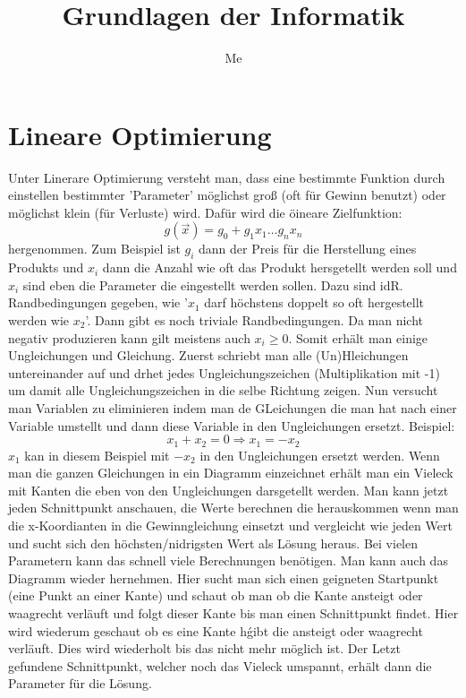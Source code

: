 \documentclass[a4paper]{scrartcl}
\author{Me}
\title{Grundlagen der Informatik}
\begin{document}
    \maketitle
    \newpage
    \tableofcontents
    \newpage

    \section{Lineare Optimierung}
    Unter Linerare Optimierung versteht man, dass eine bestimmte Funktion durch einstellen bestimmter 'Parameter' möglichst groß (oft für Gewinn benutzt) oder möglichst klein (für Verluste) wird.
    Dafür wird die öineare Zielfunktion: 
    \begin{equation*}
        g(\vec{x}) = g_0 + g_1x_1 \ldots g_nx_n
    \end{equation*}
    hergenommen. Zum Beispiel ist \(g_i\) dann der Preis für die Herstellung eines Produkts und \(x_i\) dann die Anzahl wie oft das Produkt hersgetellt werden soll und \(x_i\) sind eben die 
    Parameter die eingestellt werden sollen. Dazu sind idR. Randbedingungen gegeben, wie '\(x_1\) darf höchstens doppelt so oft hergestellt werden wie \(x_2\)'. Dann gibt es noch triviale 
    Randbedingungen. Da man nicht negativ produzieren kann gilt meistens auch \(x_i \ge 0\). Somit erhält man einige Ungleichungen und Gleichung. Zuerst schriebt man alle (Un)Hleichungen 
    untereinander auf und drhet jedes Ungleichungszeichen (Multiplikation mit -1) um damit alle Ungleichungszeichen in die selbe Richtung zeigen. Nun versucht man Variablen zu eliminieren
    indem man de GLeichungen die man hat nach einer Variable umstellt und dann diese Variable in den Ungleichungen ersetzt. Beispiel:
    \begin{equation*}
        x_1 + x_2 = 0 \Rightarrow x_1 = -x_2    
    \end{equation*}
    \(x_1\) kan in diesem Beispiel mit \(-x_2\) in den Ungleichungen ersetzt werden. Wenn man die ganzen Gleichungen in ein Diagramm einzeichnet erhält man ein Vieleck mit Kanten die eben 
    von den Ungleichungen darsgetellt werden. Man kann jetzt jeden Schnittpunkt anschauen, die Werte berechnen die herauskommen wenn man die x-Koordianten in die Gewinngleichung einsetzt und
    vergleicht wie jeden Wert und sucht sich den höchsten/nidrigsten Wert als Lösung heraus. Bei vielen Parametern kann das schnell viele Berechnungen benötigen. Man kann auch das Diagramm wieder
    hernehmen. Hier sucht man sich einen geigneten Startpunkt (eine Punkt an einer Kante) und schaut ob man ob die Kante ansteigt oder waagrecht verläuft und folgt dieser Kante bis man 
    einen Schnittpunkt findet. Hier wird wiederum geschaut ob es eine Kante hǵibt die ansteigt oder waagrecht verläuft. Dies wird wiederholt bis das nicht mehr möglich ist. Der Letzt gefundene
    Schnittpunkt, welcher noch das Vieleck umspannt, erhält dann die Parameter für die Lösung. 
\end{document}
